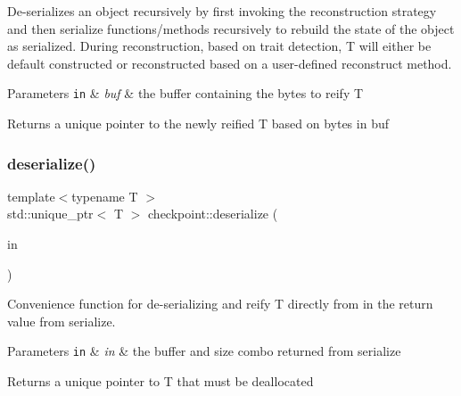 De-\/serializes an object recursively by first invoking the reconstruction strategy and then {\ttfamily serialize} functions/methods recursively to rebuild the state of the object as serialized. During reconstruction, based on trait detection, {\ttfamily T} will either be default constructed or reconstructed based on a user-\/defined reconstruct method.


\begin{DoxyParams}[1]{Parameters}
\mbox{\tt in}  & {\em buf} & the buffer containing the bytes to reify {\ttfamily T} \\
\hline
\end{DoxyParams}
\begin{DoxyReturn}{Returns}
a unique pointer to the newly reified {\ttfamily T} based on bytes in {\ttfamily buf} 
\end{DoxyReturn}
\mbox{\label{namespacecheckpoint_a1fa5c2e70f11308a1a94b163924d88f3}} 
\subsubsection{\texorpdfstring{deserialize()}{deserialize()}\hspace{0.1cm}{\footnotesize\ttfamily [3/3]}}
{\footnotesize\ttfamily template$<$typename T $>$ \\
std\+::unique\+\_\+ptr$<$ T $>$ checkpoint\+::deserialize (\begin{DoxyParamCaption}\item[{\hyperlink{namespacecheckpoint_aa61e2b491f405a63a394f9aad528c37a}{Serialized\+Return\+Type} \&\&}]{in }\end{DoxyParamCaption})}



Convenience function for de-\/serializing and reify {\ttfamily T} directly from {\ttfamily in} the return value from {\ttfamily serialize}. 


\begin{DoxyParams}[1]{Parameters}
\mbox{\tt in}  & {\em in} & the buffer and size combo returned from {\ttfamily serialize} \\
\hline
\end{DoxyParams}
\begin{DoxyReturn}{Returns}
a unique pointer to {\ttfamily T} that must be deallocated 
\end{DoxyReturn}
\mbox{\label{namespacecheckpoint_a9016e0756f91e6e982b3c824c007c251}} 
